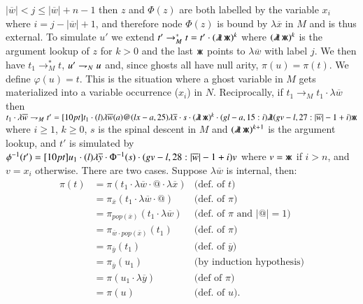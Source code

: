 \documentclass{elsarticle}
\newif\iflongversion
\theoremstyle{plain}
\theoremstyle{definition}
\newcommand{\ghostlmd}{{\lambda\mkern-7mu \lambda}}
\newcommand{\ghostvar}{\mathsf{x\mkern-5mu x}}
\def\coresymbol{\pi} %
\newcommand{\core}[1]{\coresymbol(#1)} %
\begin{document}
$|\overline{w}|<j\leq |\overline{w}| + n -1$ then $z$ and $\Phi(z)$ are both labelled by the variable $x_i$ where $i=j-|\overline{w}|+1$, and therefore node $\Phi(z)$ is bound by $\lambda\overline{x}$ in $M$ and is thus external.
%
To simulate $u'$ we extend $t' \rightarrow^*_M t = t' \cdot (\ghostlmd\, \ghostvar)^k$ where
$(\ghostlmd\, \ghostvar)^k$ is the argument lookup of $z$ for $k>0$ and
the last $\ghostvar$ points to $\lambda\overline{w}$ with label $j$. We then have $t_1 \rightarrow^*_M t$, $u'\rightharpoondown_N u$
and, since ghosts all have null arity, $\core{u} = \core{t}$. We define $\varphi(u) = t$.
This is the situation where a ghost variable in $M$ gets materialized into a variable occurrence ($x_i$) in $N$.
%
Reciprocally,
if $t_1 \rightarrow_M t_1 \cdot \lambda\overline{w}$
then
$t_1 \cdot \lambda\overline{w} \internalextension_M t' = \Pstr[10pt]{t_1 \cdot
    (l){\lambda\overline{w}}  (a)@  (lx-a,25){\lambda\overline{x}} \cdot s \cdot {(\ghostlmd\, \ghostvar)^{k}} \cdot (gl-a,15:i)\ghostlmd  (gv-l,27:{|\overline{w}|-1+i})\ghostvar }
$ where
$i\geq1$, $k\geq 0$,
$s$ is the spinal descent in $M$ and $(\ghostlmd\, \ghostvar)^{k+1}$ is the argument lookup, and $t'$ is simulated by
$\phi^{-1}(t') = \Pstr[10pt]{u_1 \cdot
    (l){\lambda\overline y} \cdot {\Phi^{-1}(s)} \cdot (gv-l,28:{|\overline{w}|-1+i}) v }
$
where $v = \ghostvar$ if $i>n$, and
$v = x_i$ otherwise.
%
\iflongversion
    There are two cases. Suppose $\lambda\overline{w}$ is internal, then:
    \begin{align*}
        \coresymbol(t)
        &=  \coresymbol(t_1 \cdot \lambda\overline{w} \cdot @ \cdot \lambda\overline{x})
            & \mbox{(def.~of $t$)}
        \\
        &=  \coresymbol_{\overline{x}}(t_1 \cdot
        \lambda\overline{w} \cdot @)
            & \mbox{(def.~of $\coresymbol$)}
        \\
        &=  \coresymbol_{pop(\overline{x})}(t_1 \cdot
        \lambda\overline{w})
            & \mbox{(def.~of $\coresymbol$ and $|@|=1$)}
        \\
        &=  \coresymbol_{\overline{w} \cdot pop(\overline{x})}(t_1)
            & \mbox{(def.~of $\coresymbol$)}
        \\
        &=  \coresymbol_{\overline{y}}(t_1)
            & \mbox{(def.~of $\overline{y}$)}
        \\
        &=  \coresymbol_{\overline{y}}(u_1)
            & \mbox{(by induction hypothesis)}
        \\
        &= \coresymbol(u_1 \cdot \lambda\overline{y}) & \mbox{(def of $\coresymbol$)} \\
        &=  \coresymbol(u)
            & \mbox{(def.~of $u$).}
    \end{align*}
\end{document}
